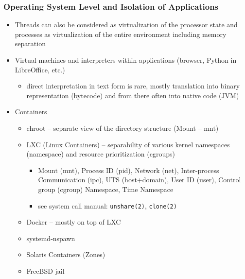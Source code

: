 \documentclass{beamer}
\begin{document}
\begin{frame}
\frametitle{Operating System Level and Isolation of Applications}

\begin{itemize}
 \item Threads can also be considered as virtualization of the processor state and processes as virtualization of the entire environment including memory separation
 \item Virtual machines and interpreters within applications (browser, Python in LibreOffice, etc.)
 \begin{itemize}
  \item direct interpretation in text form is rare, mostly translation into binary representation (bytecode) and from there often into native code (JVM)
 \end{itemize}
 \item Containers
 \begin{itemize}
  \item chroot -- separate view of the directory structure (Mount -- mnt)
  \item LXC (Linux Containers) -- separability of various kernel namespaces (namespace) and resource prioritization (cgroups)
  \begin{itemize}
   \item Mount (mnt), Process ID (pid), Network (net), Inter-process Communication (ipc), UTS (host+domain), User ID (user), Control group (cgroup) Namespace, Time Namespace
   \item see system call manual: \texttt{unshare(2)}, \texttt{clone(2)}
  \end{itemize}
  \item Docker -- mostly on top of LXC
  \item systemd-nspawn
  \item Solaris Containers (Zones)
  \item FreeBSD jail
 \end{itemize}
\end{itemize}
\end{frame}
\end{document}
